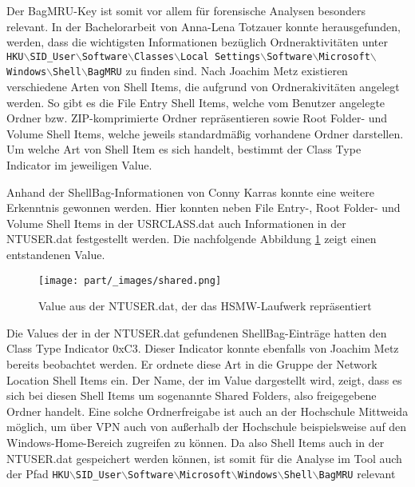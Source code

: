 Der \glqq BagMRU\grqq{}-Key ist somit vor allem für forensische Analysen besonders relevant. In der Bachelorarbeit von Anna-Lena Totzauer konnte herausgefunden, werden, dass die wichtigsten Informationen bezüglich Ordneraktivitäten unter \texttt{HKU$\backslash$SID\_User$\backslash$Software$\backslash$Classes$\backslash$Local Settings$\backslash$Software$\backslash$Microsoft$\backslash$Windows$\backslash$Shell$\backslash$BagMRU} zu finden sind.  \cite{ba} \newline
Nach Joachim Metz existieren verschiedene Arten von Shell Items, die aufgrund von Ordnerakivitäten angelegt werden. So gibt es die File Entry Shell Items, welche vom Benutzer angelegte Ordner bzw. ZIP-komprimierte Ordner repräsentieren sowie Root Folder- und Volume Shell Items, welche jeweils standardmäßig vorhandene Ordner darstellen. Um welche Art von Shell Item es sich handelt, bestimmt der Class Type Indicator im jeweiligen Value. \cite{shelltype} 

Anhand der ShellBag-Informationen von Conny Karras konnte eine weitere Erkenntnis gewonnen werden. Hier konnten neben File Entry-, Root Folder- und Volume Shell Items in der USRCLASS.dat auch Informationen in der NTUSER.dat festgestellt werden. Die nachfolgende Abbildung \ref{img:net} zeigt einen entstandenen Value.

\begin{figure}[H]
	\centering
	\texttt{[image: part/\_images/shared.png]}
	\caption{Value aus der NTUSER.dat, der das HSMW-Laufwerk repräsentiert} 
	\label{img:net}
\end{figure}

Die Values der in der NTUSER.dat gefundenen ShellBag-Einträge hatten den Class Type Indicator 0xC3. Dieser Indicator konnte ebenfalls von Joachim Metz bereits beobachtet werden. Er ordnete diese Art in die Gruppe der Network Location Shell Items ein. Der Name, der im Value dargestellt wird, zeigt, dass es sich bei diesen Shell Items um sogenannte Shared Folders, also freigegebene Ordner handelt. Eine solche Ordnerfreigabe ist auch an der Hochschule Mittweida möglich, um über VPN auch von außerhalb der Hochschule beispielsweise auf den Windows-Home-Bereich zugreifen zu können. Da also Shell Items auch in der NTUSER.dat gespeichert werden können, ist somit für die Analyse im Tool auch der Pfad \texttt{HKU$\backslash$SID\_User$\backslash$Software$\backslash$Microsoft$\backslash$Windows$\backslash$Shell$\backslash$BagMRU} relevant \cite{shelltype,hsmw}

